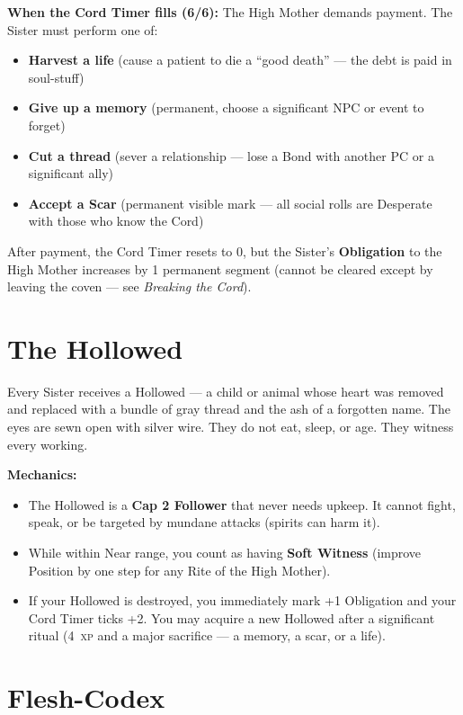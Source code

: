 \documentclass[10pt,twoside]{book}
\newcommand{\xp}[1]{#1~\textsc{xp}}
\begin{document}
\noindent\textbf{When the Cord Timer fills (6/6):} The High Mother demands payment. The Sister must perform one of:
\begin{itemize}
\item \textbf{Harvest a life} (cause a patient to die a ``good death'' --- the debt is paid in soul-stuff)
\item \textbf{Give up a memory} (permanent, choose a significant NPC or event to forget)
\item \textbf{Cut a thread} (sever a relationship --- lose a Bond with another PC or a significant ally)
\item \textbf{Accept a Scar} (permanent visible mark --- all social rolls are Desperate with those who know the Cord)
\end{itemize}

After payment, the Cord Timer resets to 0, but the Sister's \textbf{Obligation} to the High Mother increases by 1 permanent segment (cannot be cleared except by leaving the coven --- see \textit{Breaking the Cord}).

\section{The Hollowed}

Every Sister receives a Hollowed --- a child or animal whose heart was removed and replaced with a bundle of gray thread and the ash of a forgotten name. The eyes are sewn open with silver wire. They do not eat, sleep, or age. They witness every working.

\noindent\textbf{Mechanics:}
\begin{itemize}
\item The Hollowed is a \textbf{Cap 2 Follower} that never needs upkeep. It cannot fight, speak, or be targeted by mundane attacks (spirits can harm it).
\item While within Near range, you count as having \textbf{Soft Witness} (improve Position by one step for any Rite of the High Mother).
\item If your Hollowed is destroyed, you immediately mark +1 Obligation and your Cord Timer ticks +2. You may acquire a new Hollowed after a significant ritual (\xp{4} and a major sacrifice --- a memory, a scar, or a life).
\end{itemize}

\section{Flesh-Codex}
\end{document}
